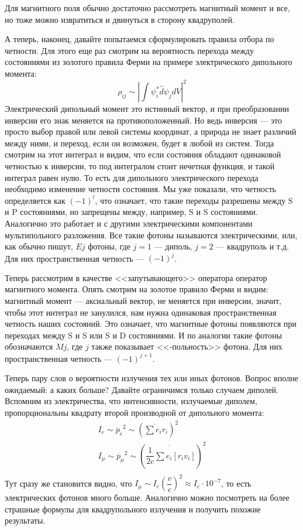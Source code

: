 \documentclass[12pt]{article}
\begin{document}
Для магнитного поля обычно достаточно рассмотреть магнитный момент и все, но тоже можно извратиться и двинуться в сторону квадруполей.

А теперь, наконец, давайте попытаемся сформулировать правила отбора по четности. Для этого еще раз смотрим на вероятность перехода между состояниями из золотого правила Ферми на примере электрического дипольного момента:
\begin{equation*}
    \rho_{ij} \sim \left| \int \psi^*_i\hat{d}\psi_j dV\right|^2
\end{equation*}
Электрический дипольный момент это истинный вектор, и при преобразовании инверсии его знак меняется на противоположенный. Но ведь инверсия --- это просто выбор правой или левой системы координат, а природа не знает различий между ними, и переход, если он возможен, будет в любой из систем. Тогда смотрим на этот интеграл и видим, что если состояния обладают одинаковой четностью к инверсии, то под интегралом стоит нечетная функция, и такой интеграл равен нулю. То есть для дипольного электрического перехода необходимо изменение четности состояния. Мы уже показали, что четность определяется как $(-1)^l$, что означает, что такие переходы разрешены между S и P состояниями, но запрещены между, например, S и S состояниями. Аналогично это работает и с другими электрическими компонентами мультипольного разложения. Все такие фотоны называются электрическими, или, как обычно пишут, $Ej$ фотоны, где $j=1$ --- диполь, $j=2$ --- квадруполь и т.д. Для них пространственная четность --- $(-1)^j$.

Теперь рассмотрим в качестве <<запутывающего>> оператора оператор магнитного момента. Опять смотрим на золотое правило Ферми и видим: магнитный момент --- аксиальный вектор, не меняется при инверсии, значит, чтобы этот интеграл не занулился, нам нужна одинаковая пространственная четность наших состояний. Это означает, что магнитные фотоны появляются при переходах между S и S или S и D состояниями. И по аналогии такие фотоны обозначаются $Mj$, где $j$ также показывает <<-польность>> фотона. Для них пространственная четность --- $(-1)^{j+1}$.

Теперь пару слов о вероятности излучения тех или иных фотонов. Вопрос вполне ожидаемый: а каких больше? Давайте ограничимся только случаем диполей. Вспомним из электричества, что интенсивности, излучаемые диполем, пропорциональны квадрату второй производной от дипольного момента:
\begin{gather*}
    I_e \sim \ddot{p_e}^2 \sim \left(\ddot{\sum{e_i r_i}} \right)^2\\
    I_{\mu} \sim \ddot{p_{\mu}}^2\sim \left(\ddot{\dfrac{1}{2c}\sum{e_i [r_i v_i]}} \right)^2\\
\end{gather*}
Тут сразу же становится видно, что $ I_{\mu} \sim  I_{e} \left(\dfrac{v}{c} \right)^2\approx I_e \cdot 10^{-7}$, то есть электрических фотонов много больше. Аналогично можно посмотреть на более страшные формулы для квадрупольного излучения и получить похожие результаты.
\end{document}
